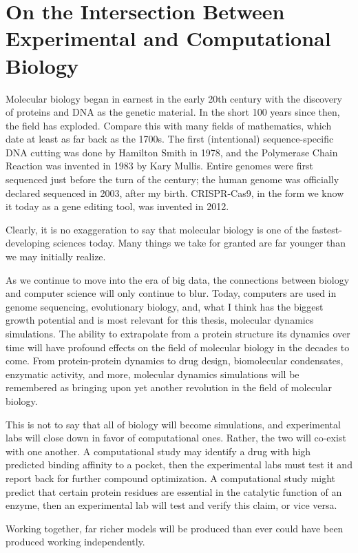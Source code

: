 \section{On the Intersection Between Experimental and Computational Biology}

Molecular biology began in earnest in the early \num{20}th century with the discovery of proteins and DNA as the genetic material. In the short \num{100} years since then, the field has exploded. Compare this with many fields of mathematics, which date at least as far back as the 1700s. The first (intentional) sequence-specific DNA cutting was done by Hamilton Smith in 1978, and the Polymerase Chain Reaction was invented in 1983 by Kary Mullis. Entire genomes were first sequenced just before the turn of the century; the human genome was officially declared sequenced in 2003, after my birth. CRISPR-Cas9, in the form we know it today as a gene editing tool, was invented in 2012.

Clearly, it is no exaggeration to say that molecular biology is one of the fastest-developing sciences today. Many things we take for granted are far younger than we may initially realize.

As we continue to move into the era of big data, the connections between biology and computer science will only continue to blur. Today, computers are used in genome sequencing, evolutionary biology, and, what I think has the biggest growth potential and is most relevant for this thesis, molecular dynamics simulations. The ability to extrapolate from a protein structure its dynamics over time will have profound effects on the field of molecular biology in the decades to come. From protein-protein dynamics to drug design, biomolecular condensates, enzymatic activity, and more, molecular dynamics simulations will be remembered as bringing upon yet another revolution in the field of molecular biology.

This is not to say that all of biology will become simulations, and experimental labs will close down in favor of computational ones. Rather, the two will co-exist with one another. A computational study may identify a drug with high predicted binding affinity to a pocket, then the experimental labs must test it and report back for further compound optimization. A computational study might predict that certain protein residues are essential in the catalytic function of an enzyme, then an experimental lab will test and verify this claim, or vice versa.

Working together, far richer models will be produced than ever could have been produced working independently.

